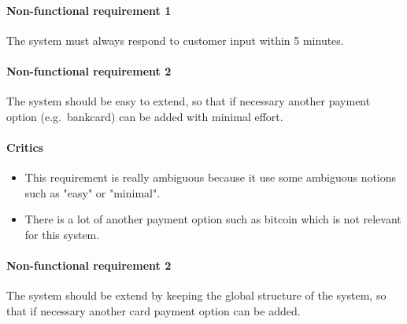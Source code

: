 \begin{framed}
\end{framed}

\paragraph{Non-functional requirement 1} The system must always respond to
customer input within 5 minutes.

\paragraph{Non-functional requirement 2} The system should be easy to
extend, so that if necessary another payment option (e.g.\ bankcard) can be
added with minimal effort.

\begin{framed}
    \paragraph{Critics} 
    \begin{itemize}
        \item This requirement is really ambiguous because it use some
            ambiguous notions such as "easy" or "minimal".

        \item There is a lot of another payment option such as bitcoin
            which is not relevant for this system.
    \end{itemize}
\paragraph{Non-functional requirement 2} The system should be extend by
keeping the global structure of the system, so that if necessary another
card payment option can be added.
\end{framed}
